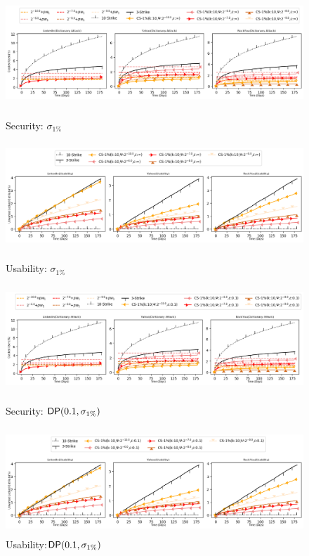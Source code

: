 \begin{figure}[htb]
	\includegraphics[width=\linewidth,height=4cm]{Figures/Experiments/Attacker/Security_Appendix_1p.png}
	\caption{Security: $\sigma_{1\%}$}\label{figure:appendix_attacker_sample}
	\includegraphics[width=\linewidth,height=4cm]{Figures/Experiments/Utility/Usability_Appendix_1p.png}
	\caption{Usability: $\sigma_{1\%}$}\label{figure:appendix_usability_sample}
	\includegraphics[width=\linewidth,height=4cm]{Figures/Experiments/Attacker/Security_Appendix_dp_1p.png}
	\caption{Security: $\textsf{DP}(0.1,\sigma_{1\%})$ }\label{figure:appendix_attacker_dpandsample}
	\includegraphics[width=\linewidth,height=4cm]{Figures/Experiments/Utility/Usability_Appendix_dp_1p.png} 
	\caption{Usability:$\textsf{DP}(0.1,\sigma_{1\%})$}\label{figure:appendix_usability_dpandsample}
\end{figure}
\clearpage


